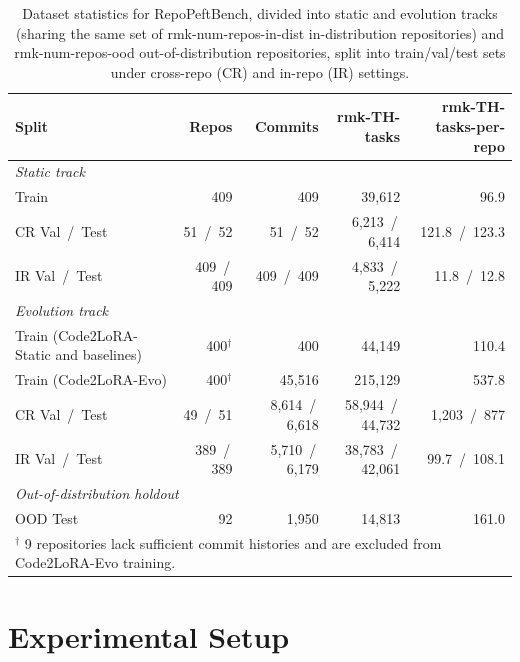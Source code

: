 \documentclass{llmxive}
\providecommand{\UseMacro}[1]{\csname rmk-#1\endcsname}
\providecommand{\codelora}{Code2LoRA\xspace}
\providecommand{\repopeftbench}{RepoPeftBench\xspace}
\providecommand{\codelorastatic}{\codelora-Static\xspace}
\providecommand{\codeloraevo}{\codelora-Evo\xspace}
\begin{document}
\begin{table}[t]
\begin{small}
\begin{center}
\setlength{\tabcolsep}{4pt}
\begin{tabular}{l r r r r}
\toprule
Split & Repos & Commits & \UseMacro{TH-tasks} & \UseMacro{TH-tasks-per-repo} \\
\midrule
\multicolumn{5}{l}{\emph{Static track}} \\
\midrule
Train             & 409 & 409 & 39{,}612 & 96.9 \\
CR Val \,/\, Test &  51 \,/\,  52 &  51 \,/\,  52 & 6{,}213 \,/\, 6{,}414 & 121.8 \,/\, 123.3 \\
IR Val \,/\, Test & 409 \,/\, 409 & 409 \,/\, 409 & 4{,}833 \,/\, 5{,}222 &  11.8 \,/\,  12.8 \\
\midrule
\multicolumn{5}{l}{\emph{Evolution track}} \\
\midrule
Train (\codelorastatic{} and baselines) & 400$^\dagger$ & 400 & 44{,}149 & 110.4 \\
Train (\codeloraevo{})     & 400$^\dagger$ & 45{,}516 & 215{,}129 & 537.8 \\
CR Val \,/\, Test &  49 \,/\,  51 & 8{,}614 \,/\, 6{,}618 & 58{,}944 \,/\, 44{,}732 & 1{,}203 \,/\,    877 \\
IR Val \,/\, Test & 389 \,/\, 389 & 5{,}710 \,/\, 6{,}179 & 38{,}783 \,/\, 42{,}061 &     99.7 \,/\, 108.1 \\
\midrule
\multicolumn{5}{l}{\emph{Out-of-distribution holdout}} \\
\midrule
OOD Test          & 92 & 1{,}950 & 14{,}813 & 161.0 \\
\bottomrule
\multicolumn{5}{l}{\footnotesize $^\dagger$ 9 repositories lack sufficient commit histories and are excluded from \codeloraevo{} training.}
\end{tabular}


\end{center}
\end{small}
\caption{Dataset statistics for \repopeftbench{}, divided into static and evolution tracks (sharing the same set of \UseMacro{num-repos-in-dist} in-distribution repositories) and \UseMacro{num-repos-ood} out-of-distribution repositories, split into train/val/test sets under cross-repo (CR) and in-repo (IR) settings.}
\label{tab:dataset_actual}
\end{table}




\section{Experimental Setup}
\label{sec:setup}
\end{document}
